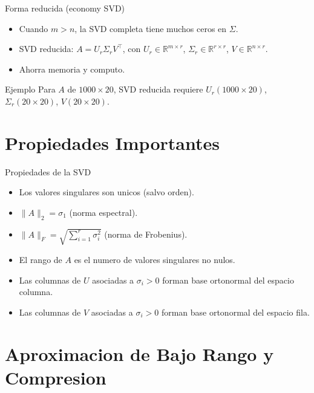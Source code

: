 \documentclass[aspectratio=169, 10pt, xcolor=table]{beamer}
\begin{document}
\begin{frame}{Forma reducida (economy SVD)}
    \begin{itemize}
        \item Cuando $m>n$, la SVD completa tiene muchos ceros en $\Sigma$.
        \item SVD reducida: $A = U_r\Sigma_r V^\top$, con $U_r\in\mathbb{R}^{m\times r}$, $\Sigma_r\in\mathbb{R}^{r\times r}$, $V\in\mathbb{R}^{n\times r}$.
        \item Ahorra memoria y computo.
    \end{itemize}
    \begin{exampleblock}{Ejemplo}
        Para $A$ de $1000\times 20$, SVD reducida requiere $U_r(1000\times20)$, $\Sigma_r(20\times20)$, $V(20\times20)$.
    \end{exampleblock}
\end{frame}

\section{Propiedades Importantes}

\begin{frame}{Propiedades de la SVD}
    \begin{itemize}
        \item Los valores singulares son unicos (salvo orden).
        \item $\|A\|_2 = \sigma_1$ (norma espectral).
        \item $\|A\|_F = \sqrt{\sum_{i=1}^r \sigma_i^2}$ (norma de Frobenius).
        \item El rango de $A$ es el numero de valores singulares no nulos.
        \item Las columnas de $U$ asociadas a $\sigma_i>0$ forman base ortonormal del espacio columna.
        \item Las columnas de $V$ asociadas a $\sigma_i>0$ forman base ortonormal del espacio fila.
    \end{itemize}
\end{frame}

\section{Aproximacion de Bajo Rango y Compresion}
\end{document}
